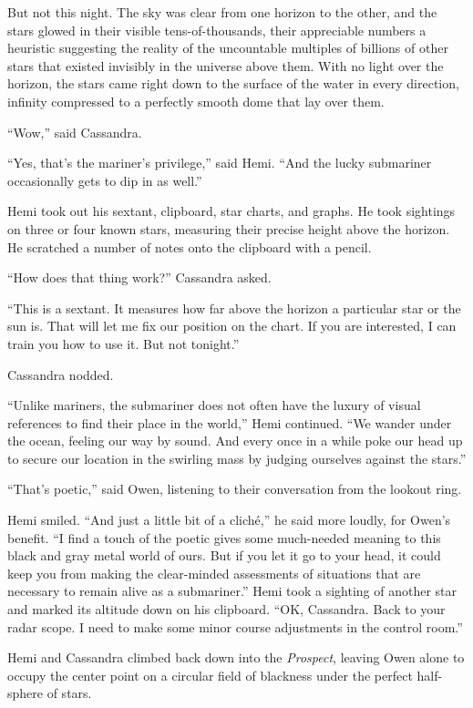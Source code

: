 \documentclass[
]{scrbook}
\begin{document}
But not this night. The sky was clear from one horizon to the other, and
the stars glowed in their visible tens-of-thousands, their appreciable
numbers a heuristic suggesting the reality of the uncountable multiples
of billions of other stars that existed invisibly in the universe above
them. With no light over the horizon, the stars came right down to the
surface of the water in every direction, infinity compressed to a
perfectly smooth dome that lay over them.

``Wow,'' said Cassandra.

``Yes, that's the mariner's privilege,'' said Hemi. ``And the lucky
submariner occasionally gets to dip in as well.''

Hemi took out his sextant, clipboard, star charts, and graphs. He took
sightings on three or four known stars, measuring their precise height
above the horizon. He scratched a number of notes onto the clipboard
with a pencil.

``How does that thing work?'' Cassandra asked.

``This is a sextant. It measures how far above the horizon a particular
star or the sun is. That will let me fix our position on the chart. If
you are interested, I can train you how to use it. But not tonight.''

Cassandra nodded.

``Unlike mariners, the submariner does not often have the luxury of
visual references to find their place in the world,'' Hemi continued.
``We wander under the ocean, feeling our way by sound. And every once in
a while poke our head up to secure our location in the swirling mass by
judging ourselves against the stars.''

``That's poetic,'' said Owen, listening to their conversation from the
lookout ring.

Hemi smiled. ``And just a little bit of a cliché,'' he said more loudly,
for Owen's benefit. ``I find a touch of the poetic gives some
much-needed meaning to this black and gray metal world of ours. But if
you let it go to your head, it could keep you from making the
clear-minded assessments of situations that are necessary to remain
alive as a submariner.'' Hemi took a sighting of another star and marked
its altitude down on his clipboard. ``OK, Cassandra. Back to your radar
scope. I need to make some minor course adjustments in the control
room.''

Hemi and Cassandra climbed back down into the \emph{Prospect}, leaving
Owen alone to occupy the center point on a circular field of blackness
under the perfect half-sphere of stars.
\end{document}
